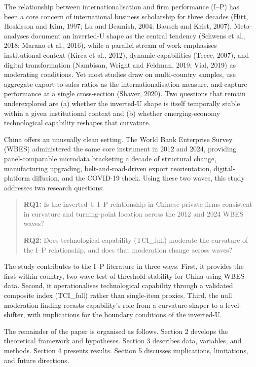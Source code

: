 \documentclass[
  12pt,a4paper]{article}
\begin{document}
The relationship between internationalisation and firm performance
(I--P) has been a core concern of international business scholarship for
three decades (Hitt, Hoskisson and Kim, 1997; Lu and Beamish, 2004;
Bausch and Krist, 2007). Meta-analyses document an inverted-U shape as
the central tendency (Schwens et al., 2018; Marano et al., 2016), while
a parallel stream of work emphasises institutional context (Kirca et
al., 2012), dynamic capabilities (Teece, 2007), and digital
transformation (Nambisan, Wright and Feldman, 2019; Vial, 2019) as
moderating conditions. Yet most studies draw on multi-country samples,
use aggregate export-to-sales ratios as the internationalisation
measure, and capture performance at a single cross-section (Shaver,
2020). Two questions that remain underexplored are (a) whether the
inverted-U shape is itself temporally stable within a given
institutional context and (b) whether emerging-economy technological
capability reshapes that curvature.

China offers an unusually clean setting. The World Bank Enterprise
Survey (WBES) administered the same core instrument in 2012 and 2024,
providing panel-comparable microdata bracketing a decade of structural
change, manufacturing upgrading, belt-and-road-driven export
reorientation, digital-platform diffusion, and the COVID-19 shock. Using
these two waves, this study addresses two research questions:

\begin{quote}
\textbf{RQ1:} Is the inverted-U I--P relationship in Chinese private
firms consistent in curvature and turning-point location across the 2012
and 2024 WBES waves?

\textbf{RQ2:} Does technological capability (TCI\_full) moderate the
curvature of the I--P relationship, and does that moderation change
across waves?
\end{quote}

The study contributes to the I--P literature in three ways. First, it
provides the first within-country, two-wave test of threshold stability
for China using WBES data. Second, it operationalises technological
capability through a validated composite index (TCI\_full) rather than
single-item proxies. Third, the null moderation finding recasts
capability's role from a curvature-shaper to a level-shifter, with
implications for the boundary conditions of the inverted-U.

The remainder of the paper is organised as follows. Section 2 develops
the theoretical framework and hypotheses. Section 3 describes data,
variables, and methods. Section 4 presents results. Section 5 discusses
implications, limitations, and future directions.
\end{document}
